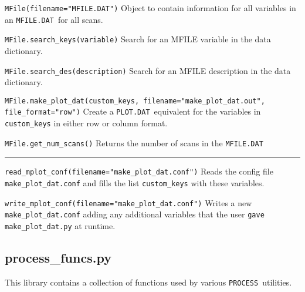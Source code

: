 \documentclass[11pt,a4paper]{report}
\newcommand{\mfile}{\mbox{\texttt{MFILE.DAT}}}
\newcommand{\plotdat}{\mbox{\texttt{PLOT.DAT}}}
\newcommand{\process}{\mbox{\texttt{PROCESS}}}
\begin{document}
\begin{description}

\item{\verb|MFile(filename="MFILE.DAT")|} Object to contain information for
  all variables in an \mfile\ for all scans.

\item{\verb|MFile.search_keys(variable)|} Search for an MFILE variable in the
  data dictionary.

\item{\verb|MFile.search_des(description)|} Search for an MFILE description in
  the data dictionary.

\item{\verb|MFile.make_plot_dat(custom_keys, filename="make_plot_dat.out", file_format="row")|}
  Create a \plotdat\ equivalent for the variables in \verb|custom_keys| in
  either row or column format.

\item{\verb|MFile.get_num_scans()|} Returns the number of scans in the
  \mfile

\end{description}

\rule{\textwidth}{0.4pt}

\begin{description}

\item{\verb|read_mplot_conf(filename="make_plot_dat.conf")|} Reads the config
  file \verb|make_plot_dat.conf| and fills the list \verb|custom_keys| with
  these variables.

\item{\verb|write_mplot_conf(filename="make_plot_dat.conf")|} Writes a new
  \verb|make_plot_dat.conf| adding any additional variables that the user
  \verb|gave make_plot_dat.py| at runtime.

\end{description}

\subsection{process\_funcs.py}

This library contains a collection of functions used by various \process\
utilities.
\end{document}
